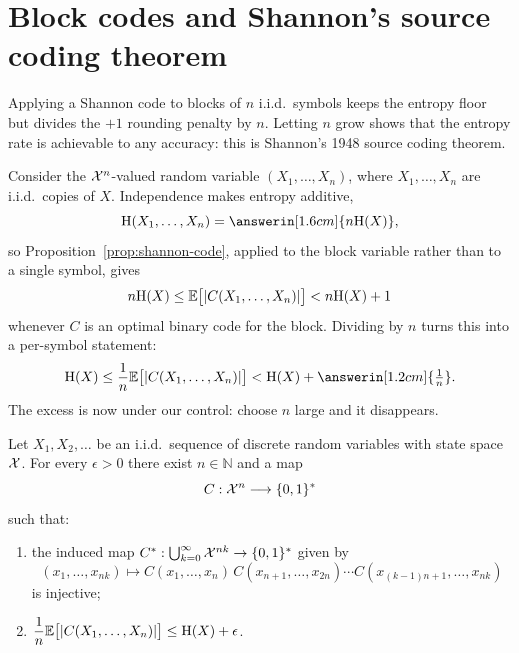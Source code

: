 \section{Block codes and Shannon's source coding theorem}\label{sec:block-codes}
\quad{}

\begin{strand}
Applying a Shannon code to blocks of $n$ i.i.d.\ symbols keeps the entropy floor
but divides the $+1$ rounding penalty by $n$. Letting $n$ grow shows that the
entropy rate is achievable to any accuracy: this is Shannon's 1948 source coding
theorem.
\end{strand}



Consider the $\mathcal{X}^n$-valued random variable $(X_1,\ldots,X_n)$, where
$X_1,\ldots,X_n$ are i.i.d.\ copies of $X$. Independence makes entropy additive,
\[
  \Ent(X_1,\ldots,X_n)=\answerin[1.6cm]{n\Ent(X)},
\]
so Proposition~\ref{prop:shannon-code}, applied to the block variable rather
than to a single symbol, gives
\[
  n\mathrm{H}(X)\le\mathbb{E}\bigl[|C(X_1,\ldots,X_n)|\bigr]<n\mathrm{H}(X)+1
\]
whenever $C$ is an optimal binary code for the block. Dividing by $n$ turns this
into a per-symbol statement:
\[
  \Ent(X)
  \le\frac1n\E\bigl[|C(X_1,\ldots,X_n)|\bigr]
  <\Ent(X)+\answerin[1.2cm]{\tfrac1n}.
\]
The excess is now under our control: choose $n$ large and it disappears.


\begin{theorem}\label{thm:shannon-source-coding}
Let $X_1,X_2,\ldots$ be an i.i.d.\ sequence of discrete random variables with
state space $\mathcal{X}$. For every $\epsilon>0$ there exist $n\in\mathbb{N}$ and a map
\[
  C:\mathcal{X}^n\longrightarrow\{0,1\}^*
\]
such that:
\begin{enumerate}
  \item the induced map
  $C^*:\bigcup_{k=0}^\infty\mathcal{X}^{nk}\to\{0,1\}^*$ given by
  \[
    (x_1,\ldots,x_{nk})
    \longmapsto
    C(x_1,\ldots,x_n)\,C(x_{n+1},\ldots,x_{2n})
    \cdots C(x_{(k-1)n+1},\ldots,x_{nk})
  \]
  is injective;
  \item $\displaystyle
  \frac1n\mathbb{E}\bigl[|C(X_1,\ldots,X_n)|\bigr]\le\mathrm{H}(X)+\epsilon$.
\end{enumerate}
\end{theorem}

